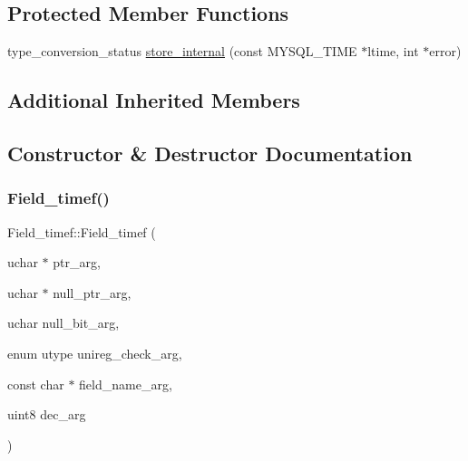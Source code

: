 \subsection*{Protected Member Functions}
\begin{DoxyCompactItemize}
\item 
type\+\_\+conversion\+\_\+status \mbox{\hyperlink{classField__timef_a37416bd1f9b3950b45bb0e450f87aa84}{store\+\_\+internal}} (const M\+Y\+S\+Q\+L\+\_\+\+T\+I\+ME $\ast$ltime, int $\ast$error)
\end{DoxyCompactItemize}
\subsection*{Additional Inherited Members}


\subsection{Constructor \& Destructor Documentation}
\mbox{\label{classField__timef_a4d61c246c27021f3d76a48267b180d0c}} 
\subsubsection{\texorpdfstring{Field\+\_\+timef()}{Field\_timef()}\hspace{0.1cm}{\footnotesize\ttfamily [1/2]}}
{\footnotesize\ttfamily Field\+\_\+timef\+::\+Field\+\_\+timef (\begin{DoxyParamCaption}\item[{uchar $\ast$}]{ptr\+\_\+arg,  }\item[{uchar $\ast$}]{null\+\_\+ptr\+\_\+arg,  }\item[{uchar}]{null\+\_\+bit\+\_\+arg,  }\item[{enum utype}]{unireg\+\_\+check\+\_\+arg,  }\item[{const char $\ast$}]{field\+\_\+name\+\_\+arg,  }\item[{uint8}]{dec\+\_\+arg }\end{DoxyParamCaption})\hspace{0.3cm}{\ttfamily [inline]}}


